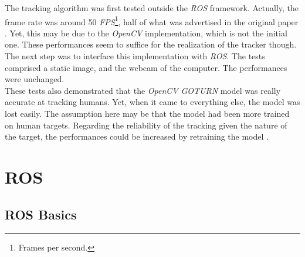 		The tracking algorithm was first tested outside the \textit{ROS}
		framework. Actually, the frame rate was around 50 \textit{FPS}\footnote{Frames per second.},
		half of what was advertised
		in the original paper \cite{goturn}. Yet, this may be due to
		the \textit{OpenCV} implementation, which is not 
		the initial one. 
		These performances seem to suffice for the realization of the tracker though.
		\\\indent The next step was to interface this implementation 
		with \textit{ROS}. The tests comprised a static image, and 
		the webcam of the computer. The performances were unchanged.
		\\\indent These tests also demonstrated that the \textit{OpenCV}
		\textit{GOTURN} model was really accurate at tracking
		humans. Yet, when it came to everything else, the model 
		was lost easily. The assumption here may be that 
		the model had been more trained on human targets. 
		Regarding the reliability of the tracking given 
		the nature of the target, the performances
		could be increased by retraining the model \cite{goturnpy}.
		
	\section{ROS}\label{ros}
	

		
		
		\subsection{ROS Basics}
		
